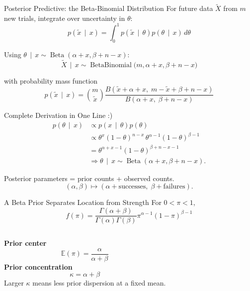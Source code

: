 \documentclass[aspectratio=43,11pt]{beamer}
\newcommand{\E}{\mathbb{E}}
\newcommand{\BetaDist}{\operatorname{Beta}}
\newcommand{\BB}{\operatorname{BetaBinomial}}
\newcommand{\given}{\,\mid\,}
\begin{document}
  \begin{frame}{Posterior Predictive: the Beta-Binomial Distribution}
    \small
    For future data $\widetilde{X}$ from $m$ new trials, integrate over uncertainty in $\theta$:
    \[
    p(\widetilde{x} \given x)
    = \int_0^1 p(\widetilde{x} \given \theta) p(\theta \given x)\,d\theta
    \]

    Using $\theta \given x \sim \BetaDist(\alpha+x,\beta+n-x)$:
    \[
    \boxed{
    \widetilde{X}\given x \sim \BB\big(m,\alpha+x,\beta+n-x\big)
  }
  \]

  with probability mass function
  \[
  p(\widetilde{x}\given x)
  = \binom{m}{\widetilde{x}}
  \frac{B(\widetilde{x}+\alpha+x,\; m-\widetilde{x}+\beta+n-x)}
  {B(\alpha+x,\; \beta+n-x)}
  \]
\end{frame}

\begin{frame}{Complete Derivation in One Line :)}
  \begin{align*}
    p(\theta \given x)
    &\propto p(x\given\theta)p(\theta) \\
    &\propto \theta^x(1-\theta)^{n-x}\,\theta^{\alpha-1}(1-\theta)^{\beta-1} \\
    &= \theta^{\alpha+x-1}(1-\theta)^{\beta+n-x-1} \\
    &\Rightarrow \theta \given x \sim \BetaDist(\alpha+x,\beta+n-x).
  \end{align*}

  \begin{block}{}
    Posterior parameters = prior counts + observed counts.
    \[
    (\alpha,\beta) \mapsto (\alpha + \text{successes},\; \beta + \text{failures}).
    \]
  \end{block}
\end{frame}

\begin{frame}{A Beta Prior Separates Location from Strength}
  For $0<\pi<1$,
  \[
  f(\pi)=\frac{\Gamma(\alpha+\beta)}{\Gamma(\alpha)\Gamma(\beta)}
  \pi^{\alpha-1}(1-\pi)^{\beta-1}
  \]
  \begin{columns}[T]
    \textbf{Prior center}
    \[
    \E(\pi)=\frac{\alpha}{\alpha+\beta}
    \]
    \textbf{Prior concentration}
    \[
    \kappa=\alpha+\beta
    \]
    Larger $\kappa$ means less prior dispersion at a fixed mean.
  \end{columns}
\end{frame}
\end{document}
